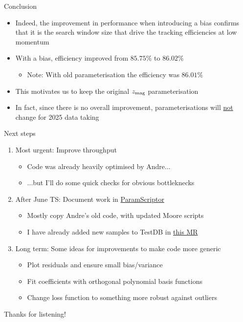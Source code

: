 \documentclass[xcolor={dvipsnames}]{beamer}
\begin{document}
\begin{frame}{Conclusion}
  \vspace{0.0cm}
  \begin{itemize}
    \setlength\itemsep{1.0em}
    \item{Indeed, the improvement in performance when introducing a bias confirms that it is the search window size that drive the tracking efficiencies at low momentum}
    \item{With a bias, efficiency improved from $85.75\%$ to $86.02\%$}
    \begin{itemize}
      \item{Note: With old parameterisation the efficiency was $86.01\%$}
    \end{itemize}
    \item{This motivates us to keep the original $z_{\rm mag}$ parameterisation}
    \item{In fact, since there is no overall improvement, parameterisations will \underline{not} change for 2025 data taking}
  \end{itemize}
\end{frame}

\begin{frame}{Next steps}
  \vspace{0.0cm}
  \begin{enumerate}
    \setlength\itemsep{1.8em}
    \item{Most urgent: Improve throughput}
    \begin{itemize}
      \item{Code was already heavily optimised by Andre...}
      \item{...but I'll do some quick checks for obvious bottleknecks}
    \end{itemize}
    \item{After June TS: Document work in \href{https://gitlab.cern.ch/lhcb/paramscriptor}{ParamScriptor}}
    \begin{itemize}
      \item{Mostly copy Andre's old code, with updated Moore scripts}
      \item{I have already added new samples to TestDB in \href{https://gitlab.cern.ch/lhcb-datapkg/PRConfig/-/merge_requests/567}{this MR}}
    \end{itemize}
    \item{Long term: Some ideas for improvements to make code more generic}
    \begin{itemize}
      \item{Plot residuals and ensure small bias/variance}
      \item{Fit coefficients with orthogonal polynomial basis functions}
      \item{Change loss function to something more robust against outliers}
    \end{itemize}
  \end{enumerate}
  \begin{center}
    \Huge Thanks for listening!
  \end{center}
\end{frame}
\end{document}
